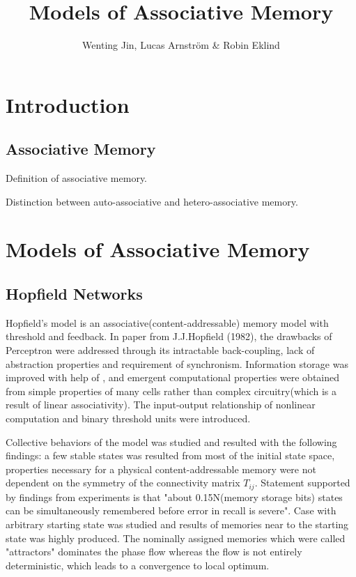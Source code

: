 \documentclass[12pt, a4paper]{article}
\title{Models of Associative Memory}
\author{Wenting Jin, Lucas Arnström \& Robin Eklind}
\begin{document}
\maketitle

\tableofcontents

\clearpage



\section{Introduction}

\subsection{Associative Memory}

Definition of associative memory.

Distinction between auto-associative and hetero-associative memory.


\section{Models of Associative Memory}

\subsection{Hopfield Networks}

Hopfield's model is an associative(content-addressable) memory model with threshold and feedback.
In paper from J.J.Hopfield (1982), the drawbacks of Perceptron were addressed through its intractable back-coupling, lack of abstraction properties and requirement of synchronism. Information storage was improved with help of , and emergent computational properties were obtained from simple properties of many cells rather than complex circuitry(which is a result of linear associativity). The input-output relationship of nonlinear computation and binary threshold units were introduced.

Collective behaviors of the model was studied and resulted with the following findings: a few stable states was resulted from most of the initial state space, properties necessary for a physical content-addressable memory were not dependent on the symmetry of the connectivity matrix $T_{ij}$. Statement supported by findings from experiments is that "about 0.15N(memory storage bits) states can be simultaneously remembered before error in recall is severe". Case with arbitrary starting state was studied and results of memories near to the starting state was highly produced. The nominally assigned memories which were called "attractors" dominates the phase flow whereas the flow is not entirely deterministic, which leads to a convergence to local optimum.
\end{document}
